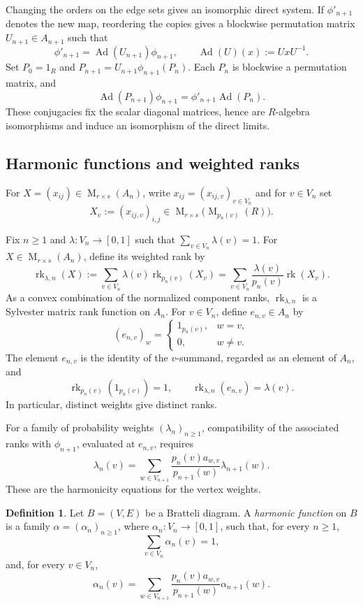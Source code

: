\documentclass[11pt]{amsart}
\DeclareMathOperator{\rk}{rk}
\DeclareMathOperator{\Mat}{M}
\DeclareMathOperator{\Ad}{Ad}
\theoremstyle{definition}
\newtheorem{definition}[theorem]{Definition}
\theoremstyle{remark}
\begin{document}
Changing the orders on the edge sets gives an isomorphic direct system.
If $\phi'_{n+1}$ denotes the new map, reordering the copies
gives a blockwise permutation matrix $U_{n+1}\in A_{n+1}$ such that
\[
 \phi'_{n+1}=\Ad(U_{n+1})\phi_{n+1},\qquad
 \Ad(U)(x):=UxU^{-1}.
\]
Set $P_0=1_R$ and $P_{n+1}=U_{n+1}\phi_{n+1}(P_n)$.  Each $P_n$ is
blockwise a permutation matrix, and
\[
 \Ad(P_{n+1})\phi_{n+1}=\phi'_{n+1}\Ad(P_n).
\]
These conjugacies fix the scalar diagonal matrices, hence are
$R$-algebra isomorphisms and induce an isomorphism of the direct limits.

\subsection{Harmonic functions and weighted ranks}

For $X=(x_{ij})\in\Mat_{r\times s}(A_n)$, write
$x_{ij}=(x_{ij,v})_{v\in V_n}$ and for \(v\in V_n\) set
\[
 X_v:=(x_{ij,v})_{i,j}
 \in\Mat_{r\times s}\bigl(\Mat_{p_n(v)}(R)\bigr).
\]

Fix $n\geq1$ and $\lambda\colon V_n\to[0,1]$ such that $\sum_{v\in V_n}\lambda(v)=1$.
For $X\in\Mat_{r\times s}(A_n)$, define its weighted rank by
\begin{equation}\label{eq:level-weighted-rank}
 \rk_{\lambda,n}(X)
 :=\sum_{v\in V_n}\lambda(v)\rk_{p_n(v)}(X_v)
 =\sum_{v\in V_n}\frac{\lambda(v)}{p_n(v)}\rk(X_v).
\end{equation}
As a convex combination of the normalized component ranks,
$\rk_{\lambda,n}$ is a Sylvester matrix rank function on $A_n$.
For $v\in V_n$, define $e_{n,v}\in A_n$ by
\[
 (e_{n,v})_w=
 \begin{cases}
  1_{p_n(v)},&w=v,\\
  0,&w\ne v.
 \end{cases}
\]
The element $e_{n,v}$ is the identity of the $v$-summand, regarded
as an element of $A_n$, and
\[
 \rk_{p_n(v)}(1_{p_n(v)})=1,
 \qquad \rk_{\lambda,n}(e_{n,v})=\lambda(v).
\]
In particular, distinct weights give distinct ranks.

For a family of probability weights $(\lambda_n)_{n\geq1}$,
compatibility of the associated ranks with $\phi_{n+1}$, evaluated at
$e_{n,v}$, requires
\[
 \lambda_n(v)=\sum_{w\in V_{n+1}}
 \frac{p_n(v)a_{w,v}}{p_{n+1}(w)}\lambda_{n+1}(w).
\]
These are the harmonicity equations for the vertex weights.

\begin{definition}\label{def:harmonic}
Let $B=(V,E)$ be a Bratteli diagram.
A \emph{harmonic function} on $B$ is a family
$\alpha=(\alpha_n)_{n\geq1}$, where
$\alpha_n\colon V_n\to[0,1]$, such that, for every $n\geq1$,
\[
 \sum_{v\in V_n}\alpha_n(v)=1,
\]
and, for every $v\in V_n$,
\begin{equation}\label{eq:harmonic}
  \alpha_n(v)=\sum_{w\in V_{n+1}}
  \frac{p_n(v)a_{w,v}}{p_{n+1}(w)}\alpha_{n+1}(w).
\end{equation}
\end{definition}
\end{document}

